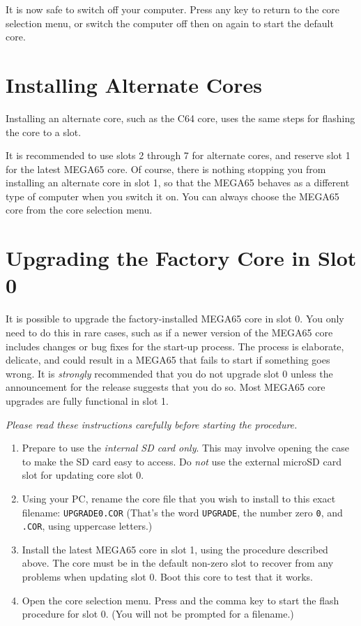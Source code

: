 It is now safe to switch off your computer. Press any key to return to the core selection menu, or switch the computer off then on again to start the default core.


\section{Installing Alternate Cores}

Installing an alternate core, such as the C64 core, uses the same steps for flashing the core to a slot.

It is recommended to use slots 2 through 7 for alternate cores, and reserve slot 1 for the latest MEGA65 core. Of course, there is nothing stopping you from installing an alternate core in slot 1, so that the MEGA65 behaves as a different type of computer when you switch it on. You can always choose the MEGA65 core from the core selection menu.


\newpage

\section{Upgrading the Factory Core in Slot 0}

It is possible to upgrade the factory-installed MEGA65 core in slot 0. You only need to do this in rare cases, such as if a newer version of the MEGA65 core includes changes or bug fixes for the start-up process. The process is elaborate, delicate, and could result in a MEGA65 that fails to start if something goes wrong. It is {\em strongly} recommended that you do not upgrade slot 0 unless the announcement for the release suggests that you do so. Most MEGA65 core upgrades are fully functional in slot 1.

{\em Please read these instructions carefully before starting the procedure.}

\begin{enumerate}
  \item Prepare to use the {\em internal SD card only}. This may involve opening the case to make the SD card easy to access. Do {\em not} use the external microSD card slot for updating core slot 0.
  \item Using your PC, rename the core file that you wish to install to this exact filename: {\tt UPGRADE0.COR} (That's the word {\tt UPGRADE}, the number zero {\tt 0}, and {\tt .COR}, using uppercase letters.)
  \item Install the latest MEGA65 core in slot 1, using the procedure described above. The core must be in the default non-zero slot to recover from any problems when updating slot 0. Boot this core to test that it works.
  \item Open the core selection menu. Press \megasymbolkey and the comma key to start the flash procedure for slot 0. (You will not be prompted for a filename.)
\end{enumerate}

